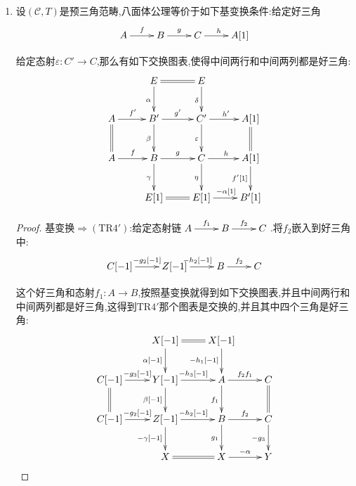 \begin{enumerate}
\begin{proof}
    	我们需要证明存在$\alpha',\beta'$使得图表交换,并且第三列是好三角.按照$\mathrm{TR}4'$,有如下交换图表,其中前两行和中间两列都是好三角.
    	$$\xymatrix{A\ar[r]^{f_1}\ar@{=}[d]&B\ar[r]^{g_1}\ar[d]^{f_2}&X\ar[r]^{h_1}\ar[d]^{\alpha}&A[1]\ar@{=}[d]\\A\ar[r]^{f_2f_1}&C\ar[r]^{g_3}\ar[d]^{g_2}&Y\ar[r]^{h_3}\ar[d]^{\beta}&A[1]\ar[d]^{f_1[1]}\\&Z\ar@{=}[r]\ar[d]^{h_2}&Z\ar[r]^{h_2}\ar[d]^{\gamma}&B[1]\\&B[1]\ar[r]^{g_1[1]}&A[1]&}$$
    	
    	但是这个图表的第一行,第二列,第二行分别是$f_1,f_2,f_2f_1$嵌入到好三角.我们解释过统一态射嵌入到的好三角是同构的,所以存在三个同构$p:X\to X'$,$q:Y\to Y'$和$r:Z\to Z'$使得$(1_A,1_B,p)$是$(A,B,X,f_1,g_1,h_1)$到$(A,B,X',f_1,g_1',h_1')$的同构.类似有另外两个好三角同构.取$\alpha=r^{-1}\alpha'p:X\to Y$和$\beta=r^{-1}\beta'q:Y\to Z$就使得图表交换.
    \end{proof}
    \item 设$(\mathscr{C},T)$是预三角范畴,八面体公理等价于如下基变换条件:给定好三角
    $$\xymatrix{A\ar[r]^f&B\ar[r]^g&C\ar[r]^h&A[1]}$$
    
    给定态射$\varepsilon:C'\to C$,那么有如下交换图表,使得中间两行和中间两列都是好三角:
    $$\xymatrix{&E\ar@{=}[r]\ar[d]_{\alpha}&E\ar[d]_{\delta}&\\A\ar@{=}[d]\ar[r]^{f'}&B'\ar[r]^{g'}\ar[d]_{\beta}&C'\ar[r]^{h'}\ar[d]_{\varepsilon}&A[1]\ar@{=}[d]\\A\ar[r]^f&B\ar[r]^g\ar[d]_{\gamma}&C\ar[r]^h\ar[d]_{\eta}&A[1]\ar[d]_{f'[1]}\\&E[1]\ar@{=}[r]&E[1]\ar[r]^{-\alpha[1]}&B'[1]}$$
    \begin{proof}
    	
    	基变换$\Rightarrow(\mathrm{TR}4')$:给定态射链$\xymatrix{A\ar[r]^{f_1}&B\ar[r]^{f_2}&C}$.将$f_2$嵌入到好三角中:
    	$$\xymatrix{C[-1]\ar[r]^{-g_2[-1]}&Z[-1]\ar[r]^{-h_2[-1]}&B\ar[r]^{f_2}&C}$$
    	
    	这个好三角和态射$f_1:A\to B$,按照基变换就得到如下交换图表,并且中间两行和中间两列都是好三角,这得到$\mathrm{TR}4'$那个图表是交换的,并且其中四个三角是好三角:
    	$$\xymatrix{&X[-1]\ar@{=}[r]\ar[d]_{\alpha[-1]}&X[-1]\ar[d]_{-h_1[-1]}&\\C[-1]\ar[r]^{-g_3[-1]}\ar@{=}[d]&Y[-1]\ar[r]^{-h_3[-1]}\ar[d]_{\beta[-1]}&A\ar[r]^{f_2f_1}\ar[d]_{f_1}&C\ar@{=}[d]\\C[-1]\ar[r]^{-g_2[-1]}&Z[-1]\ar[r]^{-h_2[-1]}\ar[d]_{-\gamma[-1]}&B\ar[r]^{f_2}\ar[d]_{g_1}&C\ar[d]_{-g_3}\\&X\ar@{=}[r]&X\ar[r]^{-\alpha}&Y}$$
    	

\end{proof}
\end{enumerate}
